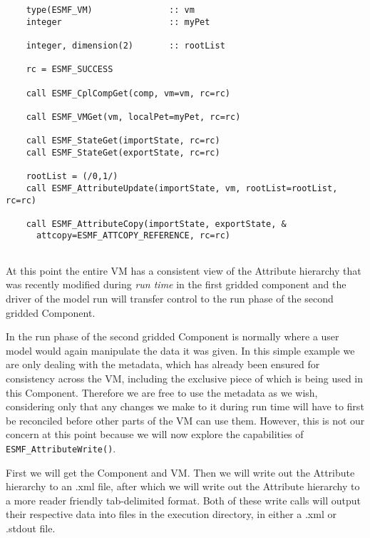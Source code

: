  \begin{verbatim}
    type(ESMF_VM)               :: vm
    integer                     :: myPet

    integer, dimension(2)       :: rootList

    rc = ESMF_SUCCESS

    call ESMF_CplCompGet(comp, vm=vm, rc=rc)

    call ESMF_VMGet(vm, localPet=myPet, rc=rc)

    call ESMF_StateGet(importState, rc=rc)
    call ESMF_StateGet(exportState, rc=rc)

    rootList = (/0,1/)
    call ESMF_AttributeUpdate(importState, vm, rootList=rootList, rc=rc)

    call ESMF_AttributeCopy(importState, exportState, &
      attcopy=ESMF_ATTCOPY_REFERENCE, rc=rc)
 
\end{verbatim}
 

   At this point the entire VM has a consistent view of the Attribute hierarchy
   that was recently modified during {\it run time} in the first gridded component
   and the driver of the model run will transfer control to the
   run phase of the second gridded Component. 

   In the run phase of the second gridded Component is normally where
   a user model would again manipulate the data it was given.  In this
   simple example we are only dealing with the metadata, which has already
   been ensured for consistency across the VM, including the exclusive
   piece of which is being used in this Component.  Therefore we are free
   to use the metadata as we wish, considering only that any changes we
   make to it during run time will have to first be reconciled before other
   parts of the VM can use them.  However, this is not our concern at this
   point because we will now explore the capabilities of {\tt ESMF\_AttributeWrite()}.
  
   First we will get the Component and VM.  Then we will write out the
   Attribute hierarchy to an .xml file,
   after which we will write out the Attribute hierarchy to a more reader
   friendly tab-delimited format.  Both of these write calls will output their
   respective data into files in the execution directory, in either a .xml
   or .stdout file. 

